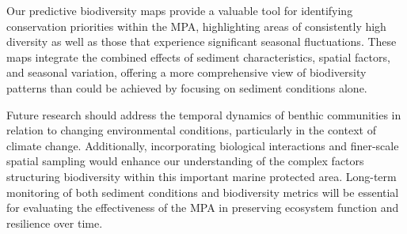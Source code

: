 \documentclass[12pt]{article}
\begin{document}
\qquad Our predictive biodiversity maps provide a valuable tool for identifying
conservation priorities within the MPA, highlighting areas of consistently high
diversity as well as those that experience significant seasonal fluctuations.
These maps integrate the combined effects of sediment characteristics, spatial
factors, and seasonal variation, offering a more comprehensive view of
biodiversity patterns than could be achieved by focusing on sediment conditions
alone.

\qquad Future research should address the temporal dynamics of benthic
communities in relation to changing environmental conditions, particularly in
the context of climate change. Additionally, incorporating biological
interactions and finer-scale spatial sampling would enhance our understanding of
the complex factors structuring biodiversity within this important marine
protected area. Long-term monitoring of both sediment conditions and
biodiversity metrics will be essential for evaluating the effectiveness of the
MPA in preserving ecosystem function and resilience over time.



\newpage






\end{document}

